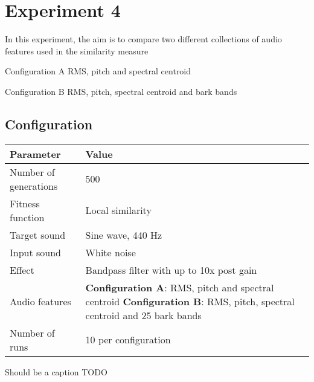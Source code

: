 \section{Experiment 4}
In this experiment, the aim is to compare two different collections of audio features used in the similarity measure

Configuration A RMS, pitch and spectral centroid

Configuration B RMS, pitch, spectral centroid and bark bands

\subsection{Configuration}
\begin{minipage}{\linewidth}
\centering
{} \label{tab:exp4_configuration} 
\begin{tabular}{ C{2.5in} C{2.6in} }\toprule[1.5pt]
\bf Parameter & \bf Value \\
\midrule
  Number of generations & 500 \\
\midrule
  Fitness function & Local similarity \\
\midrule
  Target sound & Sine wave, 440 Hz \\
\midrule
  Input sound & White noise \\
\midrule
  Effect & Bandpass filter with up to 10x post gain \\
\midrule
  Audio features & \textbf{Configuration A}: RMS, pitch and spectral centroid \newline
  \textbf{Configuration B}: RMS, pitch, spectral centroid and 25 bark bands \\
\midrule
  Number of runs & 10 per configuration \\
\bottomrule[1.25pt]
\end {tabular}\par
\bigskip
Should be a caption TODO
\end{minipage}

